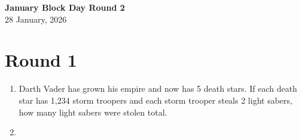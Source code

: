 \documentclass[a4paper]{article}
\begin{document}
\begin{center}
{\Large\bfseries January Block Day Round 2}\\[0.25cm]
{\large 28 January, 2026}\\[1cm]
\end{center}

\section{Round 1}
\begin{enumerate}[itemsep=2.85cm]
    \item Darth Vader has grown his empire and now has 5 death stars. If each death star has 1,234 storm troopers and each storm trooper steals 2 light sabers, how many light sabers were stolen total.
    \item 
\end{enumerate}
\end{document}
